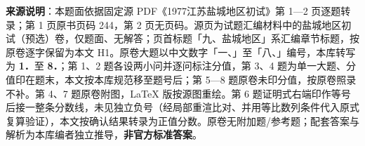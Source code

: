 


\begin{gktip}
\textbf{来源说明}：本题面依据固定源 PDF《1977江苏盐城地区初试》第 1—2 页逐题转录；第 1 页原书页码 244，第 2 页无页码。源页为试题汇编材料中的盐城地区初试（预选）卷，仅题面、无解答；页首标题「九、盐城地区」系汇编章节标题，按原卷逐字保留为本文 H1。原卷大题以中文数字「一、」至「八、」编号，本库转写为 \textbf{1．}至 \textbf{8．}；第 1、2 题各设两小问并逐问标注分值，第 3、4 题为单一大题、分值印在题末，本文按本库规范移至题号后；第 5—8 题原卷未印分值，按原卷照录不补。第 4、7 题原卷附图，LaTeX 版按源图重绘。第 6 题证明式右端印作等号后接一整条分数线，未见独立负号（经局部重渲比对、并用等比数列条件代入原式复算验证），本文按确认结果转录为正值分数。原卷无附加题/参考题；配套答案与解析为本库编者独立推导，\textbf{非官方标准答案}。
\end{gktip}

\par\medskip

